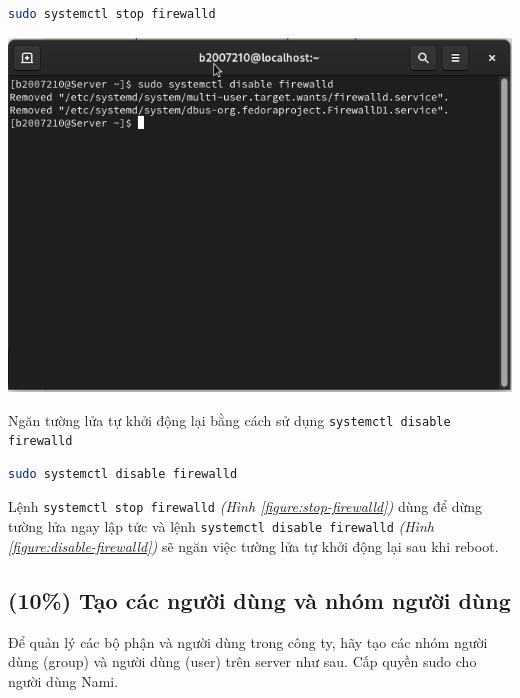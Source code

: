 \documentclass[a4paper, 11pt]{article}
\begin{document}
\begin{lstlisting}[language=bash, caption=Dừng tường lửa]
sudo systemctl stop firewalld
\end{lstlisting}

\begin{minipage}
    {\linewidth}
    \captionsetup{type=figure}
    \centering
    \includegraphics[width=\linewidth]{images/disable-firewalld.png}
    \caption{Ngăn tường lửa tự khởi động lại bằng cách sử dụng \texttt{systemctl disable firewalld}}
    \label{figure:disable-firewalld}
\end{minipage}

\begin{lstlisting}[language=bash, caption=Ngăn tường lửa tự khởi động lại]
sudo systemctl disable firewalld
\end{lstlisting}

Lệnh \texttt{systemctl stop firewalld} \textit{(Hình \ref{figure:stop-firewalld})} dùng để dừng tường lửa ngay lập tức và lệnh \texttt{systemctl disable firewalld} \textit{(Hình \ref{figure:disable-firewalld})} sẽ ngăn việc tường lửa tự khởi động lại sau khi reboot.

\subsection{(10\%) Tạo các người dùng và nhóm người dùng}

Để quản lý các bộ phận và người dùng trong công ty, hãy tạo các nhóm người dùng (group) và người dùng (user) trên server như sau. Cấp quyền sudo cho người dùng Nami.
\end{document}
